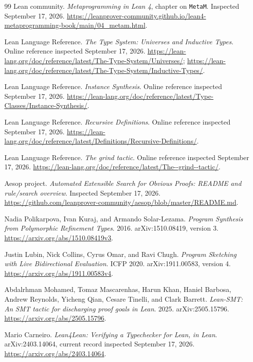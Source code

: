 \begin{thebibliography}{99}
Lean community. \emph{Metaprogramming in Lean 4}, chapter on \texttt{MetaM}.
Inspected September 17, 2026.
\url{https://leanprover-community.github.io/lean4-metaprogramming-book/main/04_metam.html}.

Lean Language Reference. \emph{The Type System: Universes and Inductive Types}.
Online reference inspected September 17, 2026.
\url{https://lean-lang.org/doc/reference/latest/The-Type-System/Universes/};
\url{https://lean-lang.org/doc/reference/latest/The-Type-System/Inductive-Types/}.

Lean Language Reference. \emph{Instance Synthesis}.
Online reference inspected September 17, 2026.
\url{https://lean-lang.org/doc/reference/latest/Type-Classes/Instance-Synthesis/}.

Lean Language Reference. \emph{Recursive Definitions}.
Online reference inspected September 17, 2026.
\url{https://lean-lang.org/doc/reference/latest/Definitions/Recursive-Definitions/}.

Lean Language Reference. \emph{The grind tactic}.
Online reference inspected September 17, 2026.
\url{https://lean-lang.org/doc/reference/latest/The--grind--tactic/}.

Aesop project. \emph{Automated Extensible Search for Obvious Proofs: README and rule/search overview}.
Inspected September 17, 2026.
\url{https://github.com/leanprover-community/aesop/blob/master/README.md}.

Nadia Polikarpova, Ivan Kuraj, and Armando Solar-Lezama.
\emph{Program Synthesis from Polymorphic Refinement Types}.
2016. arXiv:1510.08419, version 3.
\url{https://arxiv.org/abs/1510.08419v3}.

Justin Lubin, Nick Collins, Cyrus Omar, and Ravi Chugh.
\emph{Program Sketching with Live Bidirectional Evaluation}.
ICFP 2020. arXiv:1911.00583, version 4.
\url{https://arxiv.org/abs/1911.00583v4}.

Abdalrhman Mohamed, Tomaz Mascarenhas, Harun Khan, Haniel Barbosa,
Andrew Reynolds, Yicheng Qian, Cesare Tinelli, and Clark Barrett.
\emph{Lean-SMT: An SMT tactic for discharging proof goals in Lean}.
2025. arXiv:2505.15796.
\url{https://arxiv.org/abs/2505.15796}.

Mario Carneiro.
\emph{Lean4Lean: Verifying a Typechecker for Lean, in Lean}.
arXiv:2403.14064, current record inspected September 17, 2026.
\url{https://arxiv.org/abs/2403.14064}.

\end{thebibliography}
